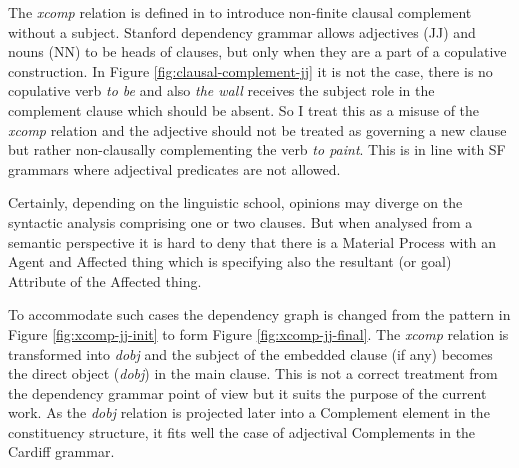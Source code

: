     The \textit{xcomp} relation is defined in \citet{Marneffe2008} to introduce non-finite clausal complement without a subject. Stanford dependency grammar allows adjectives (JJ) and nouns (NN) to be heads of clauses, but only when they are a part of a copulative construction. In Figure \ref{fig:clausal-complement-jj} it is not the case, there is no copulative verb \textit{to be} and also \textit{the wall} receives the subject role in the complement clause which should be absent. So I treat this as a misuse of the \textit{xcomp} relation and the adjective should not be treated as governing a new clause but rather non-clausally complementing the verb \textit{to paint}. This is in line with SF grammars where adjectival predicates are not allowed.

    Certainly, depending on the linguistic school, opinions may diverge on the syntactic analysis comprising one or two clauses. But when analysed from a semantic perspective it is hard to deny that there is a Material Process with an Agent and Affected thing which is specifying also the resultant (or goal) Attribute of the Affected thing. 

    To accommodate such cases the dependency graph is changed from the pattern in Figure \ref{fig:xcomp-jj-init} to form Figure \ref{fig:xcomp-jj-final}. The \textit{xcomp} relation is transformed into \textit{dobj} and the subject of the embedded clause (if any) becomes the direct object (\textit{dobj}) in the main clause. This is not a correct treatment from the dependency grammar point of view but it suits the purpose of the current work. As the \textit{dobj} relation is projected later into a Complement element in the constituency structure, it fits well the case of adjectival Complements in the Cardiff grammar.

